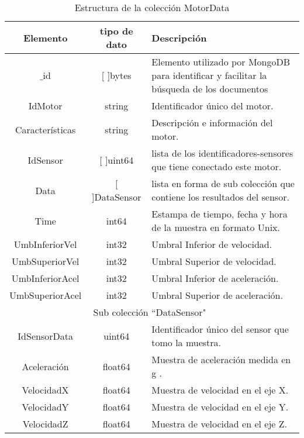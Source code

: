     \begin{table}[ht]
        \begin{center}
        \caption[Estructura de MotorData]{Estructura de la colección MotorData}
        \label{tab:MotorDatabson}

            \vspace{0.3cm}
            \begin{tabular}{|c|c|p{9cm}|}
                \hline
                Elemento        & tipo de dato & Descripción \\\hline\hline
                $\_$id      & [ ]bytes  & Elemento utilizado por MongoDB para
                identificar y facilitar la búsqueda de los documentos\\\hline
                IdMotor         & string   & Identificador único del motor.\\\hline
                Características & string   & Descripción e información del motor.\\\hline
                IdSensor        & [ ]uint64 & lista de los identificadores-sensores
                que tiene conectado este motor.\\\hline
                Data            & [ ]DataSensor & lista en forma de sub colección
                que contiene los resultados del sensor.\\\hline
                Time            & int64  & Estampa de tiempo, fecha y hora de la muestra en formato Unix.\\\hline
                UmbInferiorVel  & int32  & Umbral Inferior de velocidad.\\\hline
                UmbSuperiorVel  & int32   & Umbral Superior de velocidad.\\\hline
                UmbInferiorAcel & int32   & Umbral Inferior de aceleración.\\\hline
                UmbSuperiorAcel & int32 & Umbral Superior de aceleración.\\\hline
                \hline
                \multicolumn{3}{|c|}{Sub colección  ``DataSensor"\ }\\\hline\hline
                IdSensorData & uint64 & Identificador único del sensor que tomo la muestra.\\\hline
                Aceleración  & float64 & Muestra de aceleración medida en g .\\\hline
                VelocidadX & float64 & Muestra de velocidad en el eje X.\\\hline
                VelocidadY & float64 & Muestra de velocidad en el eje Y.\\\hline
                VelocidadZ & float64 & Muestra de velocidad en el eje Z.\\
                \hline
            \end{tabular}


\end{center}
\end{table}
